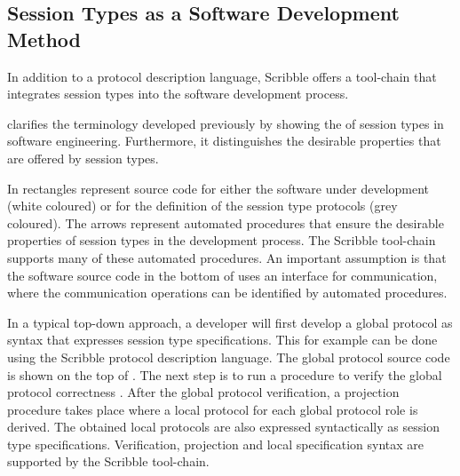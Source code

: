 \subsection{Session Types as a Software Development Method}%
\label{sec:sessions_integrate}

In addition to a protocol description language,
Scribble offers a tool-chain that 
integrates session types into the software
development process.





 clarifies the terminology
developed previously by showing the
 of session types in software
engineering.
Furthermore, it distinguishes
the desirable properties that are offered by 
session types.

In  rectangles
represent source code for either the software
under development (white coloured) or for the definition
of the session type protocols (grey coloured). 
The arrows
represent automated procedures that ensure
the desirable properties of session types
in the development process. The Scribble
tool-chain supports many of these automated
procedures.
An important assumption
is that the software source code in the
bottom of  uses an interface
for communication, where the communication
operations can be identified by automated
procedures.

In a typical top-down approach, a developer will first develop a global protocol
as syntax that expresses session type specifications.
This for example can be done
using the Scribble protocol description language.
The global protocol source code is shown
on the top of .
The next step is to run a procedure to verify the 
global protocol correctness .
After the global protocol verification, a projection
procedure takes place where a local protocol
for each global protocol role is derived.
The obtained local protocols are also expressed
syntactically as session type specifications.
Verification, projection and local specification
syntax are supported by the Scribble tool-chain.


